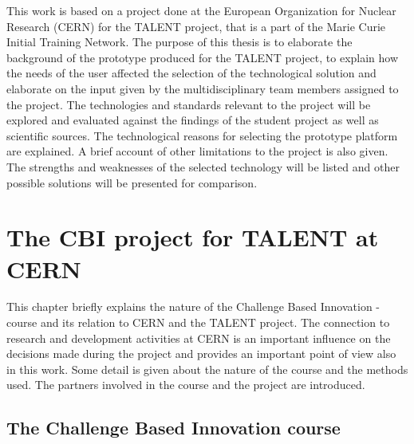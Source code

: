 \documentclass[english,12pt,a4paper,dvips]{article}
\begin{document}
\thispagestyle{empty}

This work is based on a project done at the European Organization for Nuclear Research (CERN) for the TALENT project, that is a part of the Marie Curie Initial Training Network. The purpose of this thesis is to elaborate the background of the prototype produced for the TALENT project, to explain how the needs of the user affected the selection of the technological solution and elaborate on the input given by the multidisciplinary team members assigned to the project.
The technologies and standards relevant to the project will be explored and evaluated against the findings of the student project as well as scientific sources. The technological reasons for selecting the prototype platform are explained. A brief account of other limitations to the project is also given. The strengths and weaknesses of the selected technology will be listed and other possible solutions will be presented for comparison.


\clearpage



\section{The CBI project for TALENT at CERN}

This chapter briefly explains the nature of the Challenge Based Innovation -course and its relation to CERN and the TALENT project. The connection to research and development activities at CERN is an important influence on the decisions made during the project and provides an important point of view also in this work. Some detail is given about the nature of the course and the methods used. The partners involved in the course and the project are introduced. 


\subsection{The Challenge Based Innovation course}
\end{document}
